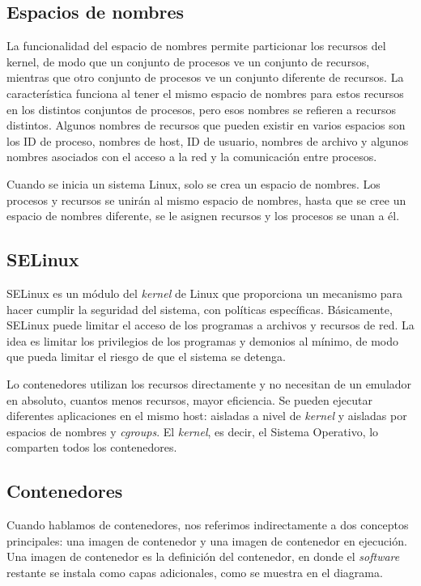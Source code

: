 \subsection*{Espacios de nombres}
La funcionalidad del espacio de nombres permite particionar los recursos del kernel, 
de modo que un conjunto de procesos ve un conjunto de recursos, mientras que otro 
conjunto de procesos ve un conjunto diferente de recursos. La característica funciona 
al tener el mismo espacio de nombres para estos recursos en los distintos conjuntos 
de procesos, pero esos nombres se refieren a recursos distintos. Algunos nombres 
de recursos que pueden existir en varios espacios son los ID de proceso, nombres 
de host, ID de usuario, nombres de archivo y algunos nombres asociados con el 
acceso a la red y la comunicación entre procesos. 

Cuando se inicia un sistema 
Linux, solo se crea un espacio de nombres. Los procesos y recursos se unirán 
al mismo espacio de nombres, hasta que se cree un espacio de nombres diferente, 
se le asignen recursos y los procesos se unan a él.

\subsection*{SELinux}
SELinux es un módulo del \emph{kernel} de Linux que proporciona un mecanismo para hacer 
cumplir la seguridad del sistema, con políticas específicas. Básicamente, SELinux 
puede limitar el acceso de los programas a archivos y recursos de red. La idea es 
limitar los privilegios de los programas y demonios al mínimo, de modo que pueda 
limitar el riesgo de que el sistema se detenga.

Lo contenedores utilizan los recursos directamente y no necesitan de un emulador en 
absoluto, cuantos menos recursos, mayor eficiencia. Se pueden ejecutar diferentes 
aplicaciones en el mismo host: aisladas a nivel de \emph{kernel} y aisladas por 
espacios de nombres y \emph{cgroups}. El \emph{kernel}, es decir, el Sistema Operativo,
 lo comparten todos los contenedores.

\subsection*{Contenedores}
Cuando hablamos de contenedores, nos referimos indirectamente a dos conceptos 
principales: una imagen de contenedor y una imagen de contenedor en ejecución. 
Una imagen de contenedor es la definición del contenedor, en donde el \emph{software} 
restante se instala como capas adicionales, como se muestra en el diagrama.

